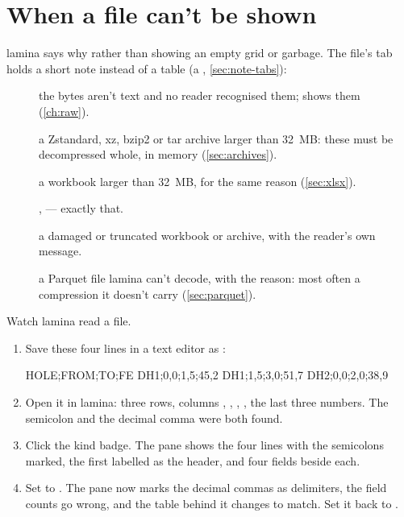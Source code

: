 \section{When a file can't be shown}\label{sec:failures}

lamina says why rather than showing an empty grid or garbage. The file's tab holds a short note instead
of a table (a , \cref{sec:note-tabs}):

\begin{description}
\item[] the bytes aren't text and no reader recognised them;  shows them (\cref{ch:raw}).
\item[] a Zstandard, xz, bzip2 or tar archive larger than 32~MB: these must be
decompressed whole, in memory (\cref{sec:archives}).
\item[] a workbook larger than 32~MB, for the same reason (\cref{sec:xlsx}).
\item[],  — exactly that.
\item[] a damaged or truncated workbook or archive, with the reader's own
message.
\item[] a Parquet file lamina can't decode, with the reason: most
often a compression it doesn't carry (\cref{sec:parquet}).
\end{description}

\begin{tryit}
Watch lamina read a file.
\begin{enumerate}
\item Save these four lines in a text editor as :
\begin{codeblock}
HOLE;FROM;TO;FE
DH1;0,0;1,5;45,2
DH1;1,5;3,0;51,7
DH2;0,0;2,0;38,9
\end{codeblock}
\item Open it in lamina: three rows, columns , , , , the last three
numbers. The semicolon and the decimal comma were both found.
\item Click the kind badge. The pane shows the four lines with the semicolons marked, the first labelled
as the header, and four fields beside each.
\item Set  to . The pane now marks the decimal commas as delimiters, the field
counts go wrong, and the table behind it changes to match. Set it back to .
\end{enumerate}
\end{tryit}
